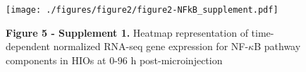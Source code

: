 \documentclass[9pt,lineo]{elife}
\date{\today}
\title{}
\begin{document}
\begin{figure}
\begin{fullwidth}
\centering\texttt{[image: ./figures/figure2/figure2-NFkB\_supplement.pdf]}
\caption*{\textbf{Figure 5 - Supplement 1. }Heatmap representation of time-dependent normalized RNA-seq gene expression for NF-$\kappa$B pathway components in HIOs at 0-96 h post-microinjection}
\label{fig:fullwidth}
\end{fullwidth}
\end{figure}
\end{document}
